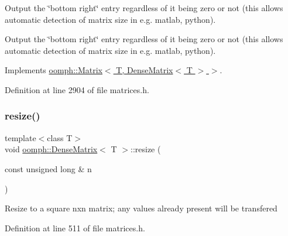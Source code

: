 Output the \char`\"{}bottom right\char`\"{} entry regardless of it being zero or not (this allows automatic detection of matrix size in e.\+g. matlab, python). 

Output the \char`\"{}bottom right\char`\"{} entry regardless of it being zero or not (this allows automatic detection of matrix size in e.\+g. matlab, python). 

Implements \hyperlink{classoomph_1_1Matrix_a10ee338f4d3893010291a692aea04248}{oomph\+::\+Matrix$<$ T, Dense\+Matrix$<$ T $>$ $>$}.



Definition at line 2904 of file matrices.\+h.

\mbox{\label{classoomph_1_1DenseMatrix_adec1ef741b1c5048a12ba9a540c2719c}} 
\subsubsection{\texorpdfstring{resize()}{resize()}\hspace{0.1cm}{\footnotesize\ttfamily [1/3]}}
{\footnotesize\ttfamily template$<$class T$>$ \\
void \hyperlink{classoomph_1_1DenseMatrix}{oomph\+::\+Dense\+Matrix}$<$ T $>$\+::resize (\begin{DoxyParamCaption}\item[{const unsigned long \&}]{n }\end{DoxyParamCaption})\hspace{0.3cm}{\ttfamily [inline]}}

Resize to a square nxn matrix; any values already present will be transfered 

Definition at line 511 of file matrices.\+h.



